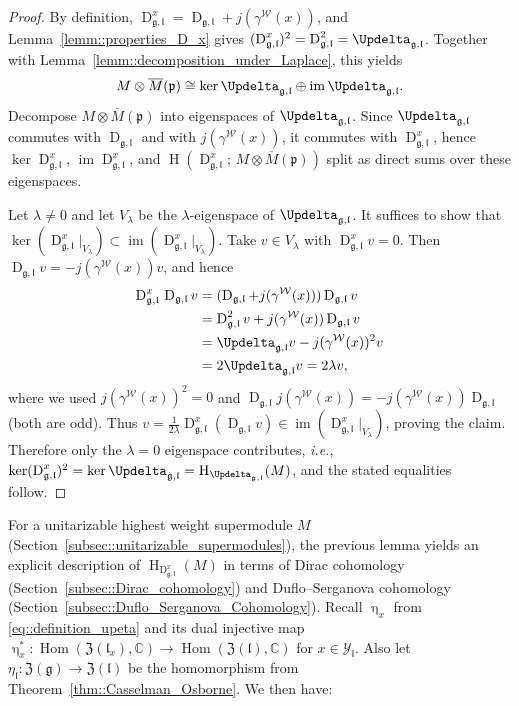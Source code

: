 \documentclass[11pt]{amsart}
\newcommand{\Hom}{\operatorname{Hom}}
\renewcommand{\Im}{\operatorname{im}}
\newcommand{\Dirac}{\operatorname{D}}
\def\WW{{\mathcal{W}}}
\def\CC{{\mathbb C}}
\def\pp{{\mathfrak p}}
\def\ZG{{\mathfrak{Z}(\gg)}}
\def\H{{\operatorname{H}}}
\def\Dx{{\operatorname{D}_{\gg,\ll}^{x}}}
\def\ll{{\mathfrak l}}
\def\YY{{\mathcal Y}}
\def\pp{{\mathfrak p}}
\def\pp{{\mathfrak{p}}}
\def\gg{{\mathfrak{g}}}
\theoremstyle{plain}
\theoremstyle{remark}
\theoremstyle{definition}
\numberwithin{equation}{section}
\theoremstyle{remark}
\begin{document}
\begin{proof}
By definition, $\Dx=\Dirac_{\gg,\ll}+j(\gamma^{\WW}(x))$, and Lemma~\ref{lemm::properties_D_x} gives $(\Dx)^{2}=\Dirac_{\gg,\ll}^{2}=\Updelta_{\gg,\ll}$. Together with Lemma~\ref{lemm::decomposition_under_Laplace}, this yields
\[
M\otimes \overline{M}(\pp)\cong \ker \Updelta_{\gg,\ll}\oplus \Im \Updelta_{\gg,\ll}.
\]
Decompose $M\otimes \overline{M}(\pp)$ into eigenspaces of $\Updelta_{\gg,\ll}$. Since $\Updelta_{\gg,\ll}$ commutes with $\Dirac_{\gg,\ll}$ and with
$j(\gamma^{\WW}(x))$, it commutes with $\Dx$, hence $\ker\Dx$, $\Im \Dx$, and $\H(\Dx;\,M\otimes \overline{M}(\pp))$ split as direct sums over these eigenspaces.

Let $\lambda\neq 0$ and let $V_{\lambda}$ be the $\lambda$-eigenspace of $\Updelta_{\gg,\ll}$. It suffices to show that
$\ker(\Dx|_{V_{\lambda}})\subset \Im(\Dx|_{V_{\lambda}})$. Take $v\in V_{\lambda}$ with $\Dx v=0$. Then
$\Dirac_{\gg,\ll}v=-j(\gamma^{\WW}(x))v$, and hence
\[
\begin{split}
\Dx\,\Dirac_{\gg,\ll}v
&=(\Dirac_{\gg,\ll}+j(\gamma^{\WW}(x)))\Dirac_{\gg,\ll}v\\
&=\Dirac_{\gg,\ll}^{2}v+j(\gamma^{\WW}(x))\Dirac_{\gg,\ll}v\\
&=\Updelta_{\gg,\ll}v-j(\gamma^{\WW}(x))^{2}v\\
&=2\Updelta_{\gg,\ll}v=2\lambda v,
\end{split}
\]
where we used $j(\gamma^{\WW}(x))^{2}=0$ and $\Dirac_{\gg,\ll}j(\gamma^{\WW}(x))=-j(\gamma^{\WW}(x))\Dirac_{\gg,\ll}$ (both are odd).
Thus $v=\frac{1}{2\lambda}\Dx(\Dirac_{\gg,\ll}v)\in\Im(\Dx|_{V_{\lambda}})$, proving the claim. Therefore only the
$\lambda=0$ eigenspace contributes, \emph{i.e.}, $\ker(\Dx)^{2}=\ker\Updelta_{\gg,\ll}=\H_{\Updelta_{\gg,\ll}}(M)$, and the stated equalities follow.
\end{proof}

For a unitarizable highest weight supermodule $M$ (Section~\ref{subsec::unitarizable_supermodules}), the previous lemma yields an explicit description of $\H_{\Dx}(M)$
in terms of Dirac cohomology (Section~\ref{subsec::Dirac_cohomology}) and Duflo--Serganova cohomology
(Section~\ref{subsec::Duflo_Serganova_Cohomology}). Recall $\upeta_{x}$ from \eqref{eq::definition_upeta} and its dual injective map
$\upeta^{*}_{x}:\Hom(\mathfrak Z(\ll_x),\CC)\to \Hom(\mathfrak Z(\ll),\CC)$ for $x\in\YY_{\ll}$. Also let
$\eta_{\ll}:\ZG\to\mathfrak Z(\ll)$ be the homomorphism from Theorem~\ref{thm::Casselman_Osborne}. We then have:
\end{document}
